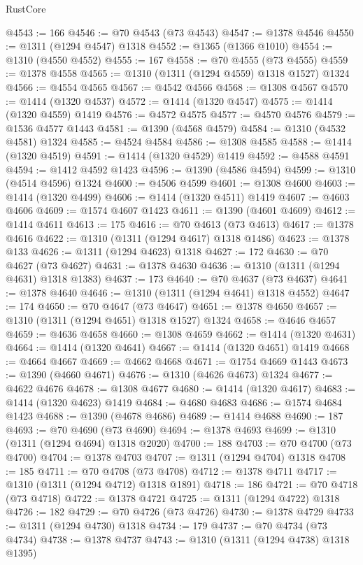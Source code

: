 \begin{lexlean}{RustCore}
\begin{coremodule}
@4543 := 166
@4546 := @70 @4543 (@73 @4543)
@4547 := @1378 @4546
@4550 := @1311 (@1294 @4547) @1318
@4552 := @1365 (@1366 @1010)
@4554 := @1310 (@4550 @4552)
@4555 := 167
@4558 := @70 @4555 (@73 @4555)
@4559 := @1378 @4558
@4565 := @1310 (@1311 (@1294 @4559) @1318 @1527) @1324
@4566 := @4554 @4565
@4567 := @4542 @4566
@4568 := @1308 @4567
@4570 := @1414 (@1320 @4537)
@4572 := @1414 (@1320 @4547)
@4575 := @1414 (@1320 @4559) @1419
@4576 := @4572 @4575
@4577 := @4570 @4576
@4579 := @1536 @4577 @1443
@4581 := @1390 (@4568 @4579)
@4584 := @1310 (@4532 @4581) @1324
@4585 := @4524 @4584
@4586 := @1308 @4585
@4588 := @1414 (@1320 @4519)
@4591 := @1414 (@1320 @4529) @1419
@4592 := @4588 @4591
@4594 := @1412 @4592 @1423
@4596 := @1390 (@4586 @4594)
@4599 := @1310 (@4514 @4596) @1324
@4600 := @4506 @4599
@4601 := @1308 @4600
@4603 := @1414 (@1320 @4499)
@4606 := @1414 (@1320 @4511) @1419
@4607 := @4603 @4606
@4609 := @1574 @4607 @1423
@4611 := @1390 (@4601 @4609)
@4612 := @1414 @4611
@4613 := 175
@4616 := @70 @4613 (@73 @4613)
@4617 := @1378 @4616
@4622 := @1310 (@1311 (@1294 @4617) @1318 @1486)
@4623 := @1378 @133
@4626 := @1311 (@1294 @4623) @1318
@4627 := 172
@4630 := @70 @4627 (@73 @4627)
@4631 := @1378 @4630
@4636 := @1310 (@1311 (@1294 @4631) @1318 @1383)
@4637 := 173
@4640 := @70 @4637 (@73 @4637)
@4641 := @1378 @4640
@4646 := @1310 (@1311 (@1294 @4641) @1318 @4552)
@4647 := 174
@4650 := @70 @4647 (@73 @4647)
@4651 := @1378 @4650
@4657 := @1310 (@1311 (@1294 @4651) @1318 @1527) @1324
@4658 := @4646 @4657
@4659 := @4636 @4658
@4660 := @1308 @4659
@4662 := @1414 (@1320 @4631)
@4664 := @1414 (@1320 @4641)
@4667 := @1414 (@1320 @4651) @1419
@4668 := @4664 @4667
@4669 := @4662 @4668
@4671 := @1754 @4669 @1443
@4673 := @1390 (@4660 @4671)
@4676 := @1310 (@4626 @4673) @1324
@4677 := @4622 @4676
@4678 := @1308 @4677
@4680 := @1414 (@1320 @4617)
@4683 := @1414 (@1320 @4623) @1419
@4684 := @4680 @4683
@4686 := @1574 @4684 @1423
@4688 := @1390 (@4678 @4686)
@4689 := @1414 @4688
@4690 := 187
@4693 := @70 @4690 (@73 @4690)
@4694 := @1378 @4693
@4699 := @1310 (@1311 (@1294 @4694) @1318 @2020)
@4700 := 188
@4703 := @70 @4700 (@73 @4700)
@4704 := @1378 @4703
@4707 := @1311 (@1294 @4704) @1318
@4708 := 185
@4711 := @70 @4708 (@73 @4708)
@4712 := @1378 @4711
@4717 := @1310 (@1311 (@1294 @4712) @1318 @1891)
@4718 := 186
@4721 := @70 @4718 (@73 @4718)
@4722 := @1378 @4721
@4725 := @1311 (@1294 @4722) @1318
@4726 := 182
@4729 := @70 @4726 (@73 @4726)
@4730 := @1378 @4729
@4733 := @1311 (@1294 @4730) @1318
@4734 := 179
@4737 := @70 @4734 (@73 @4734)
@4738 := @1378 @4737
@4743 := @1310 (@1311 (@1294 @4738) @1318 @1395)

\end{coremodule}
\end{lexlean}
